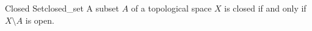 \begin{definition}{Closed Set}{closed_set}
A subset \( A \) of a topological space \( X \) is closed if and only if \( X
\setminus A \) is open.
\end{definition}
